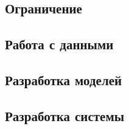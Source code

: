 \sloppy
\subsection{Ограничение}


\subsection{Работа с данными}


\subsection{Разработка моделей}


\subsection{Разработка системы}
\label{sec:sys_dev}
